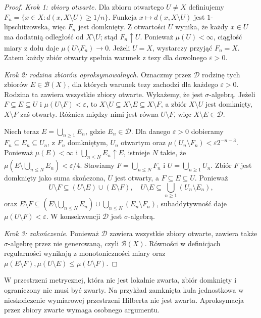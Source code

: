 \begin{proof}
\emph{Krok 1: zbiory otwarte.}
Dla zbioru otwartego $U\neq X$ definiujemy
$F_n=\{x\in X:d(x,X\setminus U)\ge1/n\}$.
Funkcja $x\mapsto d(x,X\setminus U)$ jest
$1$-lipschitzowska, więc $F_n$ jest domknięty.
Z otwartości $U$ wynika, że każdy $x\in U$
ma dodatnią odległość od $X\setminus U$;
stąd $F_n\uparrow U$. Ponieważ $\mu(U)<\infty$,
ciągłość miary z dołu daje
$\mu(U\setminus F_n)\to0$. Jeżeli $U=X$,
wystarczy przyjąć $F_n=X$. Zatem każdy zbiór otwarty
spełnia warunek z tezy dla dowolnego $\varepsilon>0$.

\emph{Krok 2: rodzina zbiorów aproksymowalnych.}
Oznaczmy przez $\mathcal D$ rodzinę tych zbiorów
$E\in\mathcal B(X)$, dla których warunek tezy zachodzi
dla każdego $\varepsilon>0$. Rodzina ta zawiera wszystkie
zbiory otwarte. Wykażemy, że jest $\sigma$-algebrą.
Jeżeli $F\subseteq E\subseteq U$ i
$\mu(U\setminus F)<\varepsilon$, to
$X\setminus U\subseteq X\setminus E\subseteq X\setminus F$,
a zbiór $X\setminus U$ jest domknięty,
$X\setminus F$ zaś otwarty. Różnica między nimi
jest równa $U\setminus F$, więc $X\setminus E\in\mathcal D$.

Niech teraz $E=\bigcup_{n\ge1}E_n$, gdzie $E_n\in\mathcal D$.
Dla danego $\varepsilon>0$ dobieramy
$F_n\subseteq E_n\subseteq U_n$, z $F_n$ domkniętym,
$U_n$ otwartym oraz
$\mu(U_n\setminus F_n)<\varepsilon2^{-n-3}$.
Ponieważ $\mu(E)<\infty$ i
$\bigcup_{n\le N}E_n\uparrow E$, istnieje $N$ takie,
że $\mu(E\setminus\bigcup_{n\le N}E_n)<\varepsilon/4$.
Stawiamy $F=\bigcup_{n\le N}F_n$ i $U=\bigcup_{n\ge1}U_n$.
Zbiór $F$ jest domknięty jako suma skończona,
$U$ jest otwarty, a $F\subseteq E\subseteq U$.
Ponieważ
\[
U\setminus F\subseteq
(U\setminus E)\cup(E\setminus F),
\quad
U\setminus E\subseteq\bigcup_{n\ge1}(U_n\setminus E_n),
\]
oraz
$E\setminus F\subseteq
(E\setminus\bigcup_{n\le N}E_n)
\cup\bigcup_{n\le N}(E_n\setminus F_n)$,
subaddytywność daje
$\mu(U\setminus F)<\varepsilon$.
W konsekwencji $\mathcal D$ jest $\sigma$-algebrą.

\emph{Krok 3: zakończenie.}
Ponieważ $\mathcal D$ zawiera wszystkie zbiory otwarte,
zawiera także $\sigma$-algebrę przez nie generowaną,
czyli $\mathcal B(X)$. Równości w definicjach regularności
wynikają z monotoniczności miary oraz
$\mu(E\setminus F),\mu(U\setminus E)\le\mu(U\setminus F)$.
\end{proof}

\begin{uwaga}
W przestrzeni metrycznej, która nie jest lokalnie zwarta,
zbiór domknięty i ograniczony nie musi być zwarty.
Na przykład zamknięta kula jednostkowa w nieskończenie
wymiarowej przestrzeni Hilberta nie jest zwarta.
Aproksymacja przez zbiory zwarte wymaga osobnego argumentu.
\end{uwaga}

